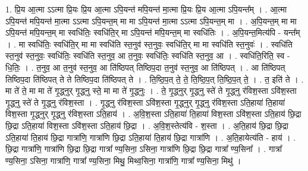 \documentclass[17pt]{extarticle}
\begin{document}
1. प्रि॒य आ॒त्मा ऽऽत्मा प्रि॒यः प्रि॒य आ॒त्मा ऽपि॒यन्त॑ मपि॒यन्त॑ मा॒त्मा प्रि॒यः प्रि॒य आ॒त्मा ऽपि॒यन्त᳚म् । . आ॒त्मा ऽपि॒यन्त॑ मपि॒यन्त॑ मा॒त्मा ऽऽत्मा ऽपि॒यन्त॒म् मा मा ऽपि॒यन्त॑ मा॒त्मा ऽऽत्मा ऽपि॒यन्त॒म् मा । . अ॒पि॒यन्त॒म् मा मा ऽपि॒यन्त॑ मपि॒यन्त॒म् मा स्वधि॑तिः॒ स्वधि॑ति॒र् मा ऽपि॒यन्त॑ मपि॒यन्त॒म् मा स्वधि॑तिः । . अ॒पि॒यन्त॒मित्य॑पि - यन्त᳚म् । . मा स्वधि॑तिः॒ स्वधि॑ति॒र् मा मा स्वधि॑ति स्त॒नुव॑ स्त॒नुवः॒ स्वधि॑ति॒र् मा मा स्वधि॑ति स्त॒नुवः॑ । . स्वधि॑ति स्त॒नुव॑ स्त॒नुवः॒ स्वधि॑तिः॒ स्वधि॑ति स्त॒नुव॒ आ त॒नुवः॒ स्वधि॑तिः॒ स्वधि॑ति स्त॒नुव॒ आ । . स्वधि॑ति॒रिति॒ स्व - धि॒तिः॒ । . त॒नुव॒ आ त॒नुव॑ स्त॒नुव॒ आ ति॑ष्ठिपत् तिष्ठिप॒दा त॒नुव॑ स्त॒नुव॒ आ ति॑ष्ठिपत् । . आ ति॑ष्ठिपत् तिष्ठिप॒दा ति॑ष्ठिपत् ते ते तिष्ठिप॒दा ति॑ष्ठिपत् ते । . ति॒ष्ठि॒प॒त् ते॒ ते॒ ति॒ष्ठि॒प॒त् ति॒ष्ठि॒प॒त् ते॒ । . त॒ इति॑ ते । . मा ते॑ ते॒ मा मा ते॑ गृ॒द्ध्नुर् गृ॒द्ध्नु स्ते॒ मा मा ते॑ गृ॒द्ध्नुः । . ते॒ गृ॒द्ध्नुर् गृ॒द्ध्नु स्ते॑ ते गृ॒द्ध्नु र॑विश॒स्ता ऽवि॑श॒स्ता गृ॒द्ध्नु स्ते॑ ते गृ॒द्ध्नु र॑विश॒स्ता । . गृ॒द्ध्नु र॑विश॒स्ता ऽवि॑श॒स्ता गृ॒द्ध्नुर् गृ॒द्ध्नु र॑विश॒स्ता ऽति॒हाया॑ ति॒हाया॑ विश॒स्ता गृ॒द्ध्नुर् गृ॒द्ध्नु र॑विश॒स्ता ऽति॒हाय॑ । . अ॒वि॒श॒स्ता ऽति॒हाया॑ ति॒हाया॑ विश॒स्ता ऽवि॑श॒स्ता ऽति॒हाय॑ छि॒द्रा छि॒द्रा ऽति॒हाया॑ विश॒स्ता ऽवि॑श॒स्ता ऽति॒हाय॑ छि॒द्रा । . अ॒वि॒श॒स्तेत्य॑वि - श॒स्ता । . अ॒ति॒हाय॑ छि॒द्रा छि॒द्रा ऽति॒हाया॑ ति॒हाय॑ छि॒द्रा गात्रा॑णि॒ गात्रा॑णि छि॒द्रा ऽति॒हाया॑ ति॒हाय॑ छि॒द्रा गात्रा॑णि । . अ॒ति॒हायेत्य॑ति - हाय॑ । . छि॒द्रा गात्रा॑णि॒ गात्रा॑णि छि॒द्रा छि॒द्रा गात्रा᳚ ण्य॒सिना॒ ऽसिना॒ गात्रा॑णि छि॒द्रा छि॒द्रा गात्रा᳚ ण्य॒सिना᳚ । . गात्रा᳚ ण्य॒सिना॒ ऽसिना॒ गात्रा॑णि॒ गात्रा᳚ ण्य॒सिना॒ मिथु॒ मिथ्व॒सिना॒ गात्रा॑णि॒ गात्रा᳚ ण्य॒सिना॒ मिथु॑ । \newline
\end{document}
